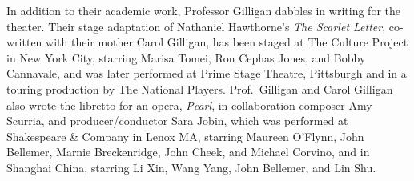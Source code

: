 In addition to their academic work, Professor Gilligan dabbles in writing for
the theater. Their stage adaptation of Nathaniel Hawthorne's
\emph{The Scarlet Letter},
co-written with their mother Carol Gilligan, has been staged at The Culture
Project in New York City, starring
Marisa Tomei, Ron Cephas Jones, and Bobby Cannavale, and was later performed
at Prime Stage Theatre, Pittsburgh and in a touring production by The National
Players.
Prof.\ Gilligan and Carol Gilligan also wrote the libretto for an opera,
\emph{Pearl}, in collaboration composer Amy Scurria, and producer/conductor
Sara Jobin, which was performed at Shakespeare \& Company in Lenox MA,
starring Maureen O'Flynn, John Bellemer, Marnie Breckenridge, John Cheek,
and Michael Corvino, and in Shanghai China,
starring Li Xin, Wang Yang, John Bellemer, and Lin Shu.
